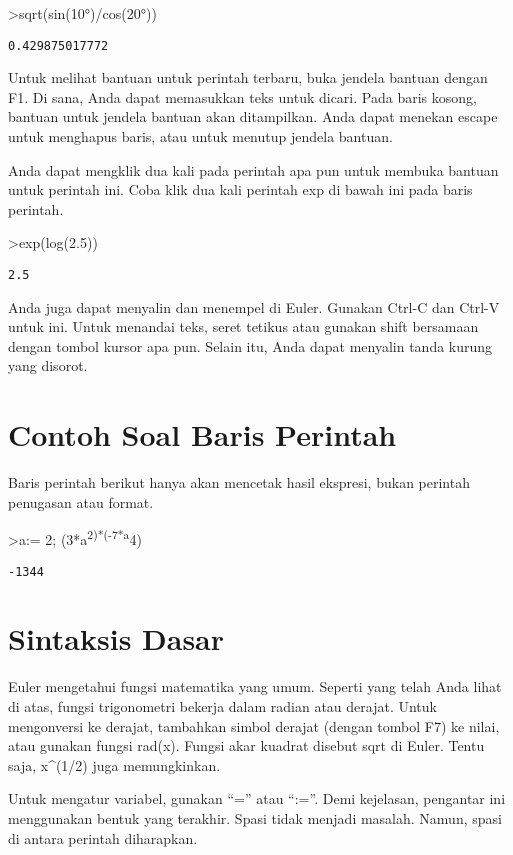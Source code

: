 \documentclass[
]{book}
\begin{document}
\textgreater sqrt(sin(10°)/cos(20°))

\begin{verbatim}
0.429875017772
\end{verbatim}

Untuk melihat bantuan untuk perintah terbaru, buka jendela bantuan dengan F1. Di sana, Anda dapat memasukkan teks untuk dicari. Pada baris kosong, bantuan untuk jendela bantuan akan ditampilkan. Anda dapat menekan escape untuk menghapus baris, atau untuk menutup jendela bantuan.

Anda dapat mengklik dua kali pada perintah apa pun untuk membuka bantuan untuk perintah ini. Coba klik dua kali perintah exp di bawah ini pada baris perintah.

\textgreater exp(log(2.5))

\begin{verbatim}
2.5
\end{verbatim}

Anda juga dapat menyalin dan menempel di Euler. Gunakan Ctrl-C dan Ctrl-V untuk ini. Untuk menandai teks, seret tetikus atau gunakan shift bersamaan dengan tombol kursor apa pun. Selain itu, Anda dapat menyalin tanda kurung yang disorot.

\section{Contoh Soal Baris Perintah}\label{contoh-soal-baris-perintah}

Baris perintah berikut hanya akan mencetak hasil ekspresi, bukan perintah penugasan atau format.

\textgreater a:= 2; (3*a\textsuperscript{2)*(-7*a}4)

\begin{verbatim}
-1344
\end{verbatim}

\section{Sintaksis Dasar}\label{sintaksis-dasar}

Euler mengetahui fungsi matematika yang umum. Seperti yang telah Anda lihat di atas, fungsi trigonometri bekerja dalam radian atau derajat. Untuk mengonversi ke derajat, tambahkan simbol derajat (dengan tombol F7) ke nilai, atau gunakan fungsi rad(x). Fungsi akar kuadrat disebut sqrt di Euler. Tentu saja, x\^{}(1/2) juga memungkinkan.

Untuk mengatur variabel, gunakan ``='' atau ``:=''. Demi kejelasan, pengantar ini menggunakan bentuk yang terakhir. Spasi tidak menjadi masalah. Namun, spasi di antara perintah diharapkan.
\end{document}
